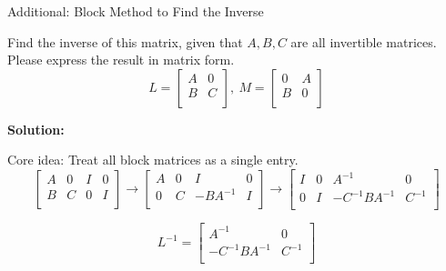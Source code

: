 \documentclass{beamer}
\begin{document}
\begin{frame}{Additional: Block Method to Find the Inverse}
\begin{example}
    Find the inverse of this matrix, given that $A,B,C$ are all invertible matrices. Please express the result in matrix form.
    \begin{equation*}
        L=\left[ \begin{matrix}
            A&		0\\
            B&		C\\
        \end{matrix} \right],\:
        M=\left[ \begin{matrix}
            0&		A\\
            B&		0\\
        \end{matrix} \right]
    \end{equation*}
\end{example}

\textbf{Solution:}

Core idea: Treat all block matrices as a single entry.
\begin{equation*}
    \left[ \begin{matrix}
        A&		0&		I&		0\\
        B&		C&		0&		I\\
    \end{matrix} \right] \rightarrow \left[ \begin{matrix}
        A&		0&		I&		0\\
        0&		C&		-BA^{-1}&		I\\
    \end{matrix} \right] \rightarrow \left[ \begin{matrix}
        I&		0&		A^{-1}&		0\\
        0&		I&		-C^{-1}BA^{-1}&		C^{-1}\\
    \end{matrix} \right]
\end{equation*}

\begin{equation*}
    L^{-1}=\left[ \begin{matrix}
        A^{-1}&		0\\
        -C^{-1}BA^{-1}&		C^{-1}\\
    \end{matrix} \right]
\end{equation*}

\end{frame}
\end{document}
